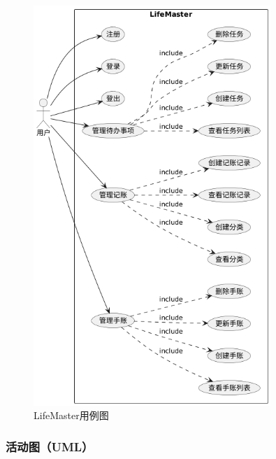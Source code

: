 \documentclass[a4paper]{article}
\begin{document}
\begin{figure}[H]
\centering
\includegraphics[width=0.8\textwidth]{img/use_case_diagram.png}
\caption{LifeMaster用例图}
\end{figure}

\subsubsection{活动图（UML）}
\end{document}
